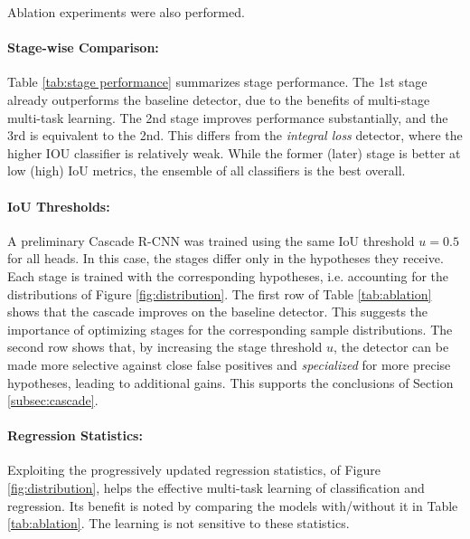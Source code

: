 \documentclass[10pt,twocolumn,letterpaper]{article}
\begin{document}
Ablation experiments were also performed.

\paragraph{Stage-wise Comparison:} Table \ref{tab:stage performance} summarizes
stage performance. The 1st stage already outperforms the baseline detector,
due to the benefits of multi-stage multi-task learning. The 2nd stage improves
performance substantially, and the 3rd is equivalent to the 2nd. This
differs from the \textit{integral loss} detector, where the higher IOU
classifier is relatively weak. While the former (later) stage is better at low (high) IoU metrics, the ensemble of all classifiers is the best overall.

\paragraph{IoU Thresholds:} A preliminary Cascade R-CNN was trained using the same IoU threshold $u=0.5$ for all heads. In this case, the stages differ
only in the hypotheses they receive. Each stage is trained with the
corresponding hypotheses, i.e. accounting for the distributions of
Figure \ref{fig:distribution}. The first row of Table \ref{tab:ablation} shows
that the cascade improves on the baseline detector. This suggests the
importance of optimizing stages for the corresponding sample distributions.
The second row shows that, by increasing the stage threshold $u$, the
detector can be made more selective against close false positives and {\it specialized\/} for more precise hypotheses, leading to additional gains. This supports the conclusions of Section \ref{subsec:cascade}.

\paragraph{Regression Statistics:} Exploiting the progressively updated regression statistics, of Figure \ref{fig:distribution}, helps the effective multi-task learning of classification and regression. Its benefit is noted by comparing the models with/without it in Table \ref{tab:ablation}. The learning is not sensitive to these statistics.
\end{document}
